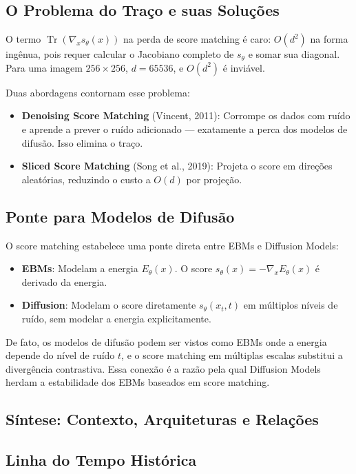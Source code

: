 \documentclass{tufte-handout}
\let\subsubsection\subsection
\begin{document}
\subsubsection{O Problema do Traço e suas Soluções}

O termo $\operatorname{Tr}(\nabla_x s_\theta(x))$ na perda de score matching é caro: $O(d^2)$ na forma ingênua, pois requer calcular o Jacobiano completo de $s_\theta$ e somar sua diagonal. Para uma imagem $256 \times 256$, $d = 65536$, e $O(d^2)$ é inviável.

Duas abordagens contornam esse problema:
\begin{itemize}
    \item \textbf{Denoising Score Matching} (Vincent, 2011): Corrompe os dados com ruído e aprende a prever o ruído adicionado --- exatamente a perca dos modelos de difusão. Isso elimina o traço.
    \item \textbf{Sliced Score Matching} (Song et al., 2019): Projeta o score em direções aleatórias, reduzindo o custo a $O(d)$ por projeção.
\end{itemize}

\subsubsection{Ponte para Modelos de Difusão}

O score matching estabelece uma ponte direta entre EBMs e Diffusion Models:
\begin{itemize}
    \item \textbf{EBMs}: Modelam a energia $E_\theta(x)$. O score $s_\theta(x) = -\nabla_x E_\theta(x)$ é derivado da energia.
    \item \textbf{Diffusion}: Modelam o score diretamente $s_\theta(x_t, t)$ em múltiplos níveis de ruído, sem modelar a energia explicitamente.
\end{itemize}

De fato, os modelos de difusão podem ser vistos como EBMs onde a energia depende do nível de ruído $t$, e o score matching em múltiplas escalas substitui a divergência contrastiva. Essa conexão é a razão pela qual Diffusion Models herdam a estabilidade dos EBMs baseados em score matching.

\subsection{Síntese: Contexto, Arquiteturas e Relações}

\subsubsection{Linha do Tempo Histórica}
\end{document}
